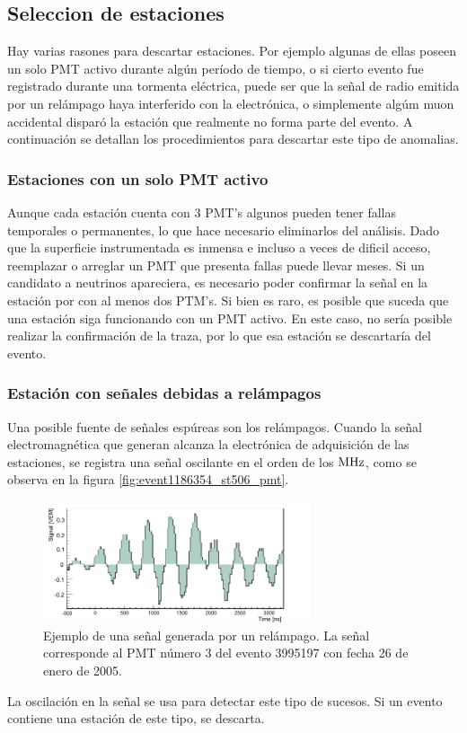 	\subsection{Seleccion de estaciones}
	
	Hay varias rasones para descartar estaciones. Por ejemplo algunas de ellas poseen un solo PMT activo durante algún período de tiempo, o si cierto evento fue registrado durante una tormenta eléctrica, puede ser que la señal de radio emitida por un relámpago haya interferido con la electrónica, o simplemente algúm muon accidental disparó la estación que realmente no forma parte del evento.
	A continuación se detallan los procedimientos para descartar este tipo de anomalias.
	
		\subsubsection{Estaciones con un solo PMT activo}
		
		Aunque cada estación cuenta con 3 PMT's algunos pueden tener fallas temporales o permanentes, lo que hace necesario eliminarlos del análisis.
		Dado que la superficie instrumentada es inmensa e incluso a veces de dificil acceso, reemplazar o arreglar un PMT que presenta fallas puede llevar meses.
		Si un candidato a neutrinos apareciera, es necesario poder confirmar la señal en la estación por con al menos dos PTM's. 
		Si bien es raro, es posible que suceda que una estación siga funcionando con un PMT activo.
		En este caso, no sería posible realizar la confirmación de la traza, por lo que esa estación se descartaría del evento.
		
		\subsubsection{Estación con señales debidas a relámpagos}
		
		Una posible fuente de señales espúreas son los relámpagos.
		Cuando la señal electromagnética que generan alcanza la electrónica de adquisición de las estaciones, se registra una señal oscilante en el orden de los $\rm MHz$, como se observa en la figura \ref{fig:event1186354_st506_pmt}.
		\begin{figure}[th!]
		\begin{center}
		\includegraphics[width=0.7\textwidth]{fig/seleccionAuger/event3995197_station506_pmt3.pdf}
		\caption{Ejemplo de una señal generada por un relámpago.
		La señal corresponde al PMT número 3 del evento 3995197 con fecha 26 de enero de 2005.}
		\label{fig:event1186354_st506_pmt3}
		\end{center}
		\end{figure}
		La oscilación en la señal se usa para detectar este tipo de sucesos.
		Si un evento contiene una estación de este tipo, se descarta.
		
